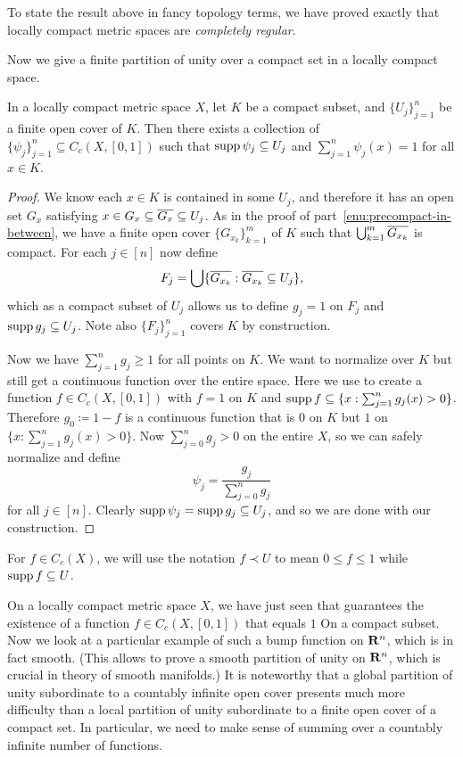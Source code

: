 To state the result above in fancy topology terms, we have proved exactly that locally compact metric spaces are \emph{completely regular}.

Now we give a finite partition of unity over a compact set in a locally compact space.

\begin{namedthm}
    In a locally compact metric space $X$, let $K$ be a compact subset, and $\{U_j\}_{j=1}^n$ be a finite open cover of $K$. Then there exists a collection of $\{\psi_j\}_{j=1}^n \subseteq C_c(X,[0,1])$ such that $\operatorname{supp} \psi_j \subseteq U_j$ and $\sum_{j=1}^n \psi_j(x) = 1$ for all $x \in K$.
\end{namedthm}
\begin{proof}
    We know each $x \in K$ is contained in some $U_j$, and therefore it has an open set $G_x$ satisfying $x \in G_x \subseteq \overline{G_x} \subseteq U_j$. As in the proof of  part~\ref{enu:precompact-in-between}, we have a finite open cover $\{G_{x_k}\}_{k=1}^m$ of $K$ such that $\bigcup_{k=1}^m \overline{G_{x_k}}$ is compact. For each $j \in [n]$ now define \[
        F_{j} = \bigcup\{\overline{G_{x_k}} : \overline{G_{x_k}}\subseteq U_j\},
    \] which as a compact subset of $U_j$ allows us to define $g_j = 1$ on $F_j$ and $\operatorname{supp} g_j \subseteq U_j$. Note also $\{F_j\}_{j=1}^n$ covers $K$ by construction.

    Now we have $\sum_{j = 1}^n g_j \geq 1$ for all points on $K$. We want to normalize over $K$ but still get a continuous function over the entire space. Here we use  to create a function $f \in C_c(X,[0,1])$ with $f = 1$ on $K$ and $\operatorname{supp} f \subseteq \{x : \sum_{j=1}^n g_j(x) > 0\}$. Therefore $g_0 \coloneqq 1 - f$ is a continuous function that is $0$ on $K$ but $1$ on $\{x : \sum_{j=1}^n g_j(x) > 0\}$. Now $\sum_{j=0}^n g_j > 0$ on the entire $X$, so we can safely normalize and define \[
        \psi_j = \frac{g_j}{\sum_{j=0}^n g_j}
    \] for all $j\in [n]$. Clearly $\operatorname{supp} \psi_j =\operatorname{supp} g_j \subseteq U_j$, and so we are done with our construction.
\end{proof}

For $f \in C_c(X)$, we will use the notation $f \prec U$ to mean $0 \leq f \leq 1$ while $\operatorname{supp} f \subseteq U$.


On a locally compact metric space $X$, we have just seen that  guarantees the existence of a function $f\in C_c(X,[0,1])$ that equals $1$ On a compact subset. Now we look at a particular example of such a bump function on $\mathbf{R}^n$, which is in fact smooth. (This allows to prove a smooth partition of unity on $\mathbf{R}^n$, which is crucial in theory of smooth manifolds.) It is noteworthy that a global partition of unity subordinate to a countably infinite open cover presents much more difficulty than a local partition of unity subordinate to a finite open cover of a compact set. In particular, we need to make sense of summing over a countably infinite number of functions.

